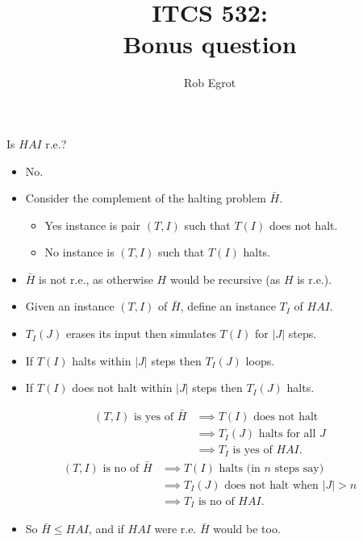 \documentclass[handout]{beamer}
\title{ITCS 532:\\ Bonus question}
\date{}
\author{Rob Egrot}
\begin{document}
\begin{frame}
\titlepage
\end{frame}

\begin{frame}
Is $HAI$ r.e.?
\vspace{1cm}
\begin{itemize}
\item No.
\end{itemize}
\end{frame}

\begin{frame}
\begin{itemize}
\item Consider the complement of the halting problem $\bar{H}$.
\begin{itemize}
\item Yes instance is pair $(T,I)$ such that $T(I)$ does not halt.
\item No instance is $(T,I)$ such that $T(I)$ halts.
\end{itemize}
\vspace{1cm}
\item $\bar{H}$ is not r.e., as otherwise $H$ would be recursive (as $H$ is r.e.).
\end{itemize}
\end{frame}

\begin{frame}
\begin{itemize}
\item Given an instance $(T,I)$ of $\bar{H}$, define an instance $T_I$ of $HAI$.
\item $T_I(J)$ erases its input then simulates $T(I)$ for $|J|$ steps.
\item If $T(I)$ halts within $|J|$ steps then $T_I(J)$ loops.
\item If $T(I)$ does not halt within $|J|$ steps then $T_I(J)$ halts.
\end{itemize}
\begin{align*}(T,I) \text{ is yes of $\bar{H}$} &\implies T(I) \text{ does not halt}\\ &\implies T_I(J) \text{ halts for all } J \\&\implies T_I \text{ is yes of $HAI$.}\end{align*}
\begin{align*}(T,I) \text{ is no of $\bar{H}$} &\implies T(I) \text{ halts (in $n$ steps say)}\\
&\implies T_I(J) \text{ does not halt when } |J|>n\\
&\implies T_I \text{ is no of $HAI$}.\end{align*}
\begin{itemize}
\item So $\bar{H}\leq HAI$, and if $HAI$ were r.e. $\bar{H}$ would be too.
\end{itemize}
\end{frame}
\end{document}
